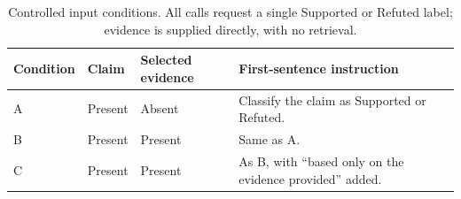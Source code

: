 \begin{table}[htbp]\centering\small
\caption{Controlled input conditions. All calls request a single Supported or Refuted label; evidence is supplied directly, with no retrieval.}\label{tab:conditions}
\begin{tabularx}{\linewidth}{lllX}\toprule
Condition & Claim & Selected evidence & First-sentence instruction \\\midrule
A & Present & Absent & Classify the claim as Supported or Refuted. \\
B & Present & Present & Same as A. \\
C & Present & Present & As B, with ``based only on the evidence provided'' added. \\
\bottomrule
\end{tabularx}
\end{table}